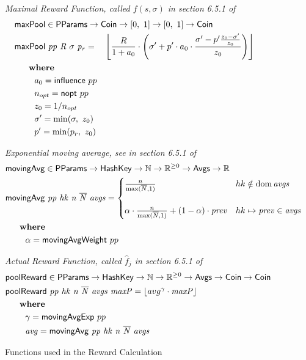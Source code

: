 \begin{figure}[htb]
  \emph{Maximal Reward Function, called $f(s,\sigma)$ in section 6.5.1 of \cite{delegation_design}}
  \begin{align*}
      & \fun{maxPool} \in \PParams \to \Coin \to \unitInterval \to \unitInterval \to \Coin \\
      & \fun{maxPool}~\var{pp}~\var{R}~\sigma~\var{p_r} =
          ~~~\floor*{
             \frac{R}{1 + a_0}
             \cdot
             \left(
               \sigma' + p'\cdot a_0\cdot\frac{\sigma' - p'\frac{z_0-\sigma'}{z_0}}{z_0}
             \right)} \\
      & ~~~\where \\
      & ~~~~~~~a_0 = \fun{influence}~pp \\
      & ~~~~~~~n_{opt} = \fun{nopt}~pp \\
      & ~~~~~~~z_0 = 1/n_{opt} \\
      & ~~~~~~~\sigma'=\min(\sigma,~z_0) \\
      & ~~~~~~~p'=\min(p_r,~z_0) \\
  \end{align*}

  \emph{Exponential moving average, see in section 6.5.1 of \cite{delegation_design}}
  \begin{align*}
      & \fun{movingAvg} \in \PParams \to \HashKey \to \N \to \Rnn \to \Avgs \to \R \\
      & \movingAvg{pp}{hk}{n}{\overline{N}}{avgs} =
        \begin{cases}
        \frac{n}{\max(\overline{N}, 1)}
        & hk\notin \dom\var{avgs}\\
        \\
          \alpha\cdot\frac{n}{\max(\overline{N}, 1)}+(1-\alpha)\cdot\var{prev}
        & hk\mapsto\var{prev}\in\var{avgs}\\
        \end{cases} \\
      & ~~~\where \\
      & ~~~~~~~\alpha = \fun{movingAvgWeight}~pp \\
  \end{align*}

  \emph{Actual Reward Function, called $\hat{f}_j$ in section 6.5.1 of \cite{delegation_design}}
  \begin{align*}
      & \fun{poolReward} \in \PParams \to \HashKey \to \N \to \Rnn \to \Avgs \to \Coin \to \Coin \\
      & \poolReward{pp}{hk}{n}{\overline{N}}{avgs}{maxP} =
      \floor*{avg^\gamma\cdot \var{maxP}}\\
      & ~~~\where \\
      & ~~~~~~~\gamma = \fun{movingAvgExp}~pp \\
      & ~~~~~~~\var{avg} = \movingAvg{pp}{hk}{n}{\overline{N}}{avgs} \\
  \end{align*}
  \caption{Functions used in the Reward Calculation}
  \label{fig:functions:rewards}
\end{figure}

